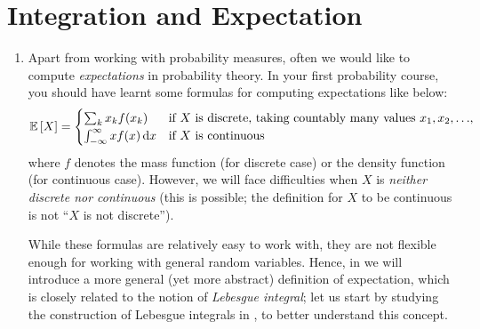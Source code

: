 \section{Integration and Expectation}
\label{sect:integration-expectation}
\begin{enumerate}
\item Apart from working with probability measures, often we would like to
compute \emph{expectations} in probability theory. In your first probability
course, you should have learnt some formulas for computing expectations like
below:
\[
\expv{X}=\begin{cases}
\sum_{k}^{}x_kf(x_k)&\text{if \(X\) is discrete, taking countably many values \(x_1,x_2,\dotsc\)}, \\
\int_{-\infty}^{\infty}xf(x)\odif{x}&\text{if \(X\) is continuous}
\end{cases}
\]
where \(f\) denotes the mass function (for discrete case) or the density
function (for continuous case). However, we will face difficulties when \(X\)
is \emph{neither discrete nor continuous} (this is possible; the definition
for \(X\) to be continuous is not ``\(X\) is not discrete''\warn{}).

While these formulas are relatively easy to work with, they are not flexible
enough for working with general random variables. Hence, in
 we will introduce a more general (yet more
abstract) definition of expectation, which is closely related to the notion of
\emph{Lebesgue integral}; let us start by studying the construction of Lebesgue
integrals in , to better understand this
concept.
\end{enumerate}
